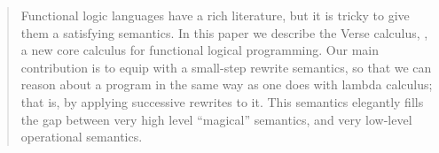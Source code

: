 \documentclass[acmsmall,review,anonymous,dvipsnames]{acmart}
\begin{document}
\begin{abstract}
  Functional logic languages have a rich literature, but it is tricky
  to give them a satisfying semantics.  In this paper we describe the
  Verse calculus, \versecalc{}, a new core calculus for functional
  logical programming. Our main contribution is to equip \versecalc{} with a
  small-step rewrite semantics, so that we can reason
  about a \versecalc{} program in the same way as one does with lambda
  calculus; that is, by applying successive rewrites to it.
  This semantics elegantly fills the gap between very high level
  ``magical'' semantics, and very low-level operational semantics.
\end{abstract}
\end{document}
